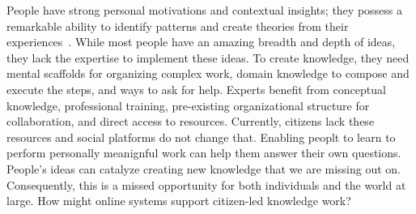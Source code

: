 

People have strong personal motivations and contextual insights; they possess a remarkable ability to identify patterns and create theories from their experiences~\cite{Gelman2011}. While most people have an amazing breadth and depth of ideas, they lack the expertise to implement these ideas. To create knowledge, they need mental scaffolds for organizing complex work, domain knowledge to compose and execute the steps, and ways to ask for help. Experts benefit from conceptual knowledge, professional training, pre-existing organizational structure for collaboration, and direct access to resources. Currently, citizens lack these resources and social platforms do not change that. Enabling peoplt to learn to perform personally meanignful work can help them answer their own questions. People's ideas can catalyze creating new knowledge that we are missing out on. Consequently, this is a missed opportunity for both individuals and the world at large.  How might online systems support citizen-led knowledge work? 






